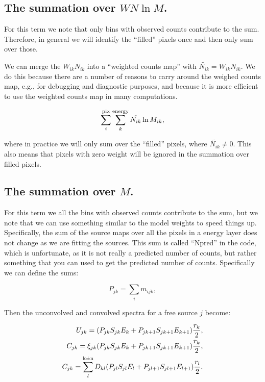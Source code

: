 \documentclass[preprint]{aastex}
\begin{document}
\subsection{The summation over \texorpdfstring{$W N \ln M$}{WN ln M}.}\label{subsec:like_sum1}

For this term we note that only bins with observed counts contribute
to the sum.  Therefore, in general we will identify the ``filled''
pixels once and then only sum over those.

We can merge the $W_{ik} N_{ik}$ into a ``weighted counts map'' with
$\tilde{N_{ik}} = W_{ik} N_{ik}$.  We do this because there are a
number of reasons to carry around the weighed counts map, e.g., for
debugging and diagnostic purposes, and because it is more efficient to
use the weighted counts map in many computations.

\begin{equation}
  \sum_i^{\rm pix} \sum_k^{\rm energy} \tilde{N_{ik}} \ln M_{ik},
\end{equation}

\noindent where in practice we will only sum over the ``filled''
pixels, where $\tilde{N_{ik}} \ne 0$.  This also means that 
pixels with zero weight will be ignored in the summation over
filled pixels. 


\subsection{The summation over \texorpdfstring{$M$}{M}.}\label{subsec:like_sum2}

For this term we all the bins with observed counts contribute to the
sum, but we note that we can use something similar to the model
weights to speed things up.  Specifically, the sum of the source maps
over all the pixels in a energy layer does not change as we are fitting
the sources.  This sum is called ``Npred'' in the code, which is
unfortunate, as it is not really a predicted number of counts, but
rather something that you can used to get the predicted number of
counts.  Specifically we can define the sums:

\begin{equation}
  P_{jk} = \sum_i m_{ijk},
\end{equation}

\noindent Then the unconvolved and convolved spectra for a free
source $j$ become:

\begin{eqnarray}\label{eq:spectra_no_weights}
  U_{jk} = (P_{jk} S_{jk} E_k + P_{jk+1} S_{jk+1} E_{k+1})\frac{r_k}{2},  \nonumber \\
  C_{jk} = \xi_{jk} ( P_{jk} S_{jk} E_k + P_{jk+1} S_{jk+1} E_{k+1} ) \frac{r_k}{2}, \nonumber \\
  C_{jk} = \sum_l^{\rm k\pm n} D_{kl}  (P_{jl} S_{jl} E_l + P_{jl+1} S_{jl+1} E_{l+1})\frac{r_l}{2}.
\end{eqnarray}
\end{document}
